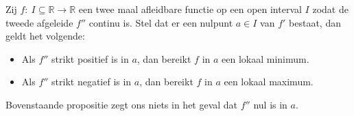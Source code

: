 \documentclass[main.tex]{subfiles}
\begin{document}
\begin{bpr}
  Zij $f:\ I \subseteq \mathbb{R} \rightarrow \mathbb{R}$ een twee maal afleidbare functie op een open interval $I$ zodat de tweede afgeleide $f''$ continu is.
  Stel dat er een nulpunt $a\in I$ van $f'$ bestaat, dan geldt het volgende:
  \begin{itemize}
  \item Als $f''$ strikt positief is in $a$, dan bereikt $f$ in $a$ een lokaal minimum.
  \item Als $f''$ strikt negatief is in $a$, dan bereikt $f$ in $a$ een lokaal maximum.
  \end{itemize}
\end{bpr}

\begin{opm}
  Bovenstaande propositie zegt ons niets in het geval dat $f''$ nul is in $a$.
\end{opm}
\end{document}
